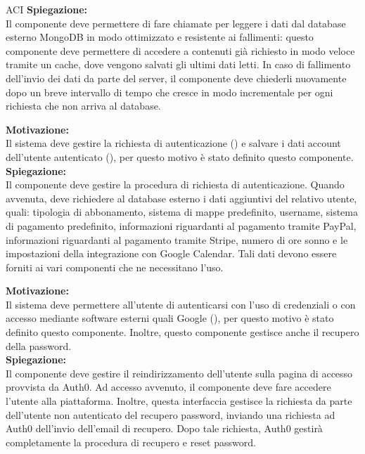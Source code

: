 \begin{listaPersonale}{ACI}
    \textbf{Spiegazione:}\\
    Il componente deve permettere di fare chiamate per leggere i dati dal database esterno MongoDB in modo ottimizzato e resistente ai fallimenti: questo componente deve permettere di accedere a contenuti già richiesto in modo veloce tramite un cache, dove vengono salvati gli ultimi dati letti. In caso di fallimento dell'invio dei dati da parte del server, il componente deve chiederli nuovamente dopo un breve intervallo di tempo che cresce in modo incrementale per ogni richiesta che non arriva al database.



    \textbf{Motivazione:}\\
    Il sistema deve gestire la richiesta di autenticazione () e salvare i dati account dell'utente autenticato (), per questo motivo è stato definito questo componente.\\

    \textbf{Spiegazione:}\\
    Il componente deve gestire la procedura di richiesta di autenticazione. Quando avvenuta, deve richiedere al database esterno i dati aggiuntivi del relativo utente, quali: tipologia di abbonamento, sistema di mappe predefinito, username, sistema di pagamento predefinito, informazioni riguardanti al pagamento tramite PayPal, informazioni riguardanti al pagamento tramite Stripe, numero di ore sonno e le impostazioni della integrazione con Google Calendar. Tali dati devono essere forniti ai vari componenti che ne necessitano l'uso.



    \textbf{Motivazione:}\\
    Il sistema deve permettere all'utente di autenticarsi con l'uso di credenziali o con accesso mediante software esterni quali Google (), per questo motivo è stato definito questo componente. Inoltre, questo componente gestisce anche il recupero della password.\\

    \textbf{Spiegazione:}\\
    Il componente deve gestire il reindirizzamento dell'utente sulla pagina di accesso provvista da Auth0. Ad accesso avvenuto, il componente deve fare accedere l'utente alla piattaforma. Inoltre, questa interfaccia gestisce la richiesta da parte dell'utente non autenticato del recupero password, inviando una richiesta ad Auth0 dell'invio dell'email di recupero. Dopo tale richiesta, Auth0 gestirà completamente la procedura di recupero e reset password.



\end{listaPersonale}
